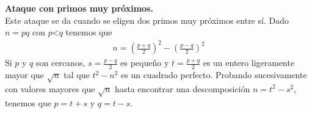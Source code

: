 \begin{description}
	\item \textbf{Ataque con primos muy próximos.}\\
	Este ataque se da cuando se eligen dos primos muy próximos entre sí. Dado $n=pq$ con $p$\textless $q$ tenemos que  
	\begin{align*}
			n=\left (\frac{p+q}{2}\right )^2-\left (\frac{p-q}{2}\right )^2
	\end{align*}
	Si $p$ y $q$ son cercanos, $s=\frac{p-q}{2}$ es pequeño y $t=\frac{p+q}{2}$ es un entero ligeramente mayor que $\sqrt{n}$ tal que $t^2 - n^2$ es un cuadrado perfecto. Probando sucesivamente con valores mayores que $\sqrt{n}$ hasta encontrar una descomposición $n=t^2-s^2$, tenemos que $p=t+s$ y $q=t-s$.
\end{description}
